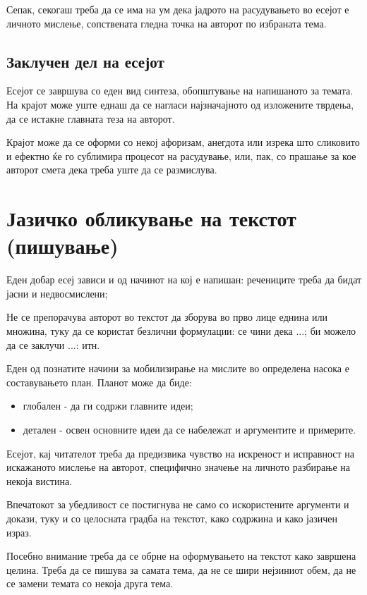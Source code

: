 \documentclass[12pt,a4paper]{article}
\begin{document}
Сепак, секогаш треба да се има на ум дека јадрото на ра­судувањето во есејот е
личното мислење, сопствената глед­на точка на авторот по избраната тема.
   
\subsection{Заклучен дел на есејот} 
 
Есејот се завршува со еден вид синтеза, обопштување на напишаното за темата. На
крајот може уште еднаш да се нагласи најзначајното од изложените тврдења, да се
истакне главната теза на авторот.

Крајот може да се оформи со не­кој афоризам, анегдота или изрека што сликовито и
ефект­но ќе го сублимира процесот на расудување, или, пак, со прашање за кое
авторот смета дека треба уште да се раз­мислува.


\section{Јазичко обликување на текстот (пишување)}

Еден добар есеј зависи и од начинот на кој е напишан: речениците треба да бидат
јасни и недвосмислени;

Не се препорачува авторот во текстот да зборува во прво лице еднина или множина,
туку да се користат безлични фор­мулации: се чини дека ...; би можело да се
заклучи ...: итн.

Еден од познатите начини за мобилизирање на мислите во определена насока е
составувањето план. Планот може да биде:

\begin{itemize}
  \item глобален - да ги содржи главните идеи;
  \item детален - освен основните идеи да се набележат и аргументите и
  примерите.
\end{itemize}
 
Есејот, кај читателот треба да предизвика чувство на ис­креност и исправност на
искажаното мислење на авторот, специфично значење на личното разбирање на некоја
висти­на.

Впечатокот за убедливост се постигнува не само со ис­користените аргументи и
докази, туку и со целосната град­ба на текстот, како содржина и како јазичен
израз.

Посебно внимание треба да се обрне на оформувањето на текстот како завршена
целина. Треба да се пишува за самата тема, да не се шири нејзиниот обем, да не
се за­мени темата со некоја друга тема.
 
\end{document}
